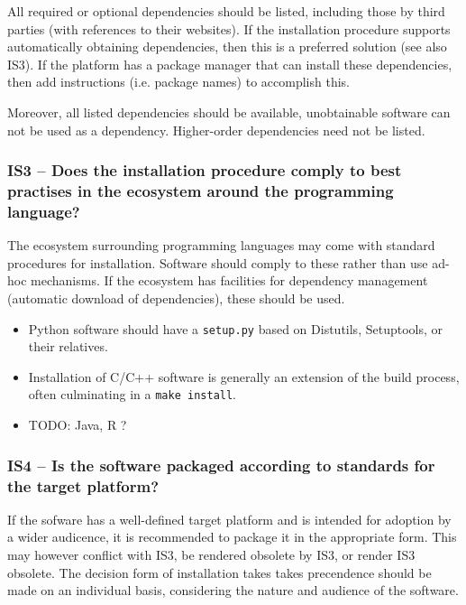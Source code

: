 \documentclass[a4paper,11pt]{article}
\begin{document}
All required or optional dependencies should be listed, including those by
third parties (with references to their websites). If the installation
procedure supports automatically obtaining dependencies, then this is a
preferred solution (see also IS3). If the platform has a package manager that
can install these dependencies, then add instructions (i.e. package names) to
accomplish this.

Moreover, all listed dependencies should be available, unobtainable software
can not be used as a dependency. Higher-order dependencies need not be listed.

\subsubsection{IS3 -- Does the installation procedure comply to best practises
in the ecosystem around the programming language?}

The ecosystem surrounding programming languages may come with standard
procedures for installation. Software should comply to these rather than use
ad-hoc mechanisms. If the ecosystem has facilities for dependency management
(automatic download of dependencies), these should be used.

\begin{itemize}
 \item Python software should have a \texttt{setup.py} based on Distutils,
     Setuptools, or their relatives.
 \item Installation of C/C++ software is generally an extension of the build
     process, often culminating in a \texttt{make install}.
 \item TODO: Java, R ?
\end{itemize}

\subsubsection{IS4 -- Is the software packaged according to standards for the target platform?}

If the sofware has a well-defined target platform and is intended for adoption
by a wider audicence, it is recommended to package it in the appropriate form.
This may however conflict with IS3, be rendered obsolete by IS3, or render IS3
obsolete. The decision form of installation takes takes precendence should be
made on an individual basis, considering the nature and audience of the
software.
\end{document}
